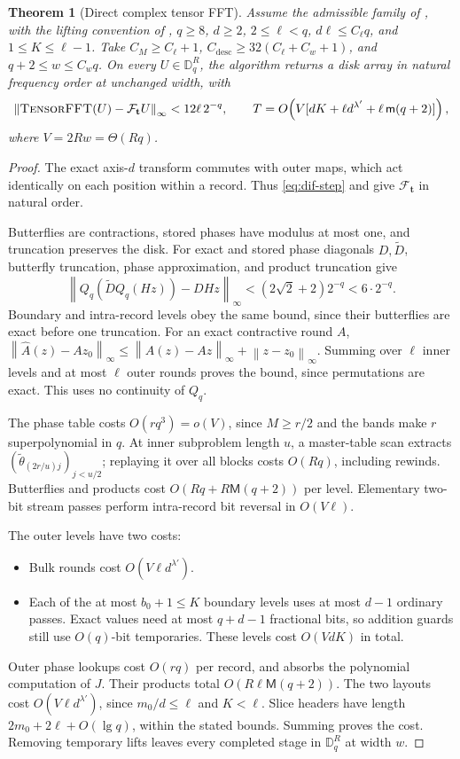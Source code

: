 \documentclass[11pt]{article}
\newtheorem{theorem}{Theorem}[section]
\theoremstyle{definition}
\renewcommand{\label}[1]{}%
\newcommand{\Disk}{\mathbb{D}}
\newcommand{\cF}{\mathcal{F}}
\newcommand{\norm}[1]{\left\lVert #1 \right\rVert}
\newcommand{\TensorFFT}{\textnormal{\textsc{TensorFFT}}}
\begin{document}
\begin{theorem}[Direct complex tensor FFT]\label{thm:direct-fft}
Assume the admissible family of , with the lifting
convention of , $q\ge8$, $d\ge2$, $2\le\ell<q$,
$d\ell\le C_\ell q$, and $1\le K\le\ell-1$.
Take $C_M\ge C_\ell+1$, $C_{\mathrm{desc}}\ge32(C_\ell+C_w+1)$,
and $q+2\le w\le C_wq$.
On every $U\in\Disk_q^R$, the algorithm returns a disk array in natural
frequency order at unchanged width, with
\[
 \norm{\TensorFFT(U)-\cF_{\mathbf t}U}_\infty<12\ell\,2^{-q},
 \qquad
 T=O\!\left(V[dK+\ell d^{\lambda'}+\ell\,\mathsf m(q+2)]\right),
\]
where $V=2Rw=\Theta(Rq)$.
\end{theorem}
\begin{proof}
The exact axis-$d$ transform commutes with outer maps, which act identically on each position within a record.
Thus \eqref{eq:dif-step} and  give $\cF_{\mathbf t}$ in natural order.

Butterflies are contractions, stored phases have modulus at most one,
and truncation preserves the disk.
For exact and stored phase diagonals $D,\widetilde D$, butterfly truncation,
phase approximation, and product truncation give
\[
 \norm{Q_q(\widetilde DQ_q(Hz))-DHz}_\infty
 <(2\sqrt2+2)2^{-q}<6\cdot2^{-q}.
\]
Boundary and intra-record levels obey the same bound, since their butterflies are exact before one truncation.
For an exact contractive round $A$,
$\norm{\widehat A(z)-Az_0}_\infty
 \le\norm{\widehat A(z)-Az}_\infty+\norm{z-z_0}_\infty$.
Summing over $\ell$ inner levels and at most $\ell$ outer rounds proves the bound, since permutations are exact.
This uses no continuity of $Q_q$.

The phase table costs $O(rq^3)=o(V)$, since $M\ge r/2$ and the bands make
$r$ superpolynomial in $q$.
At inner subproblem length $u$, a master-table scan extracts
$(\tilde\theta_{(2r/u)j})_{j<u/2}$; replaying it over all blocks costs
$O(Rq)$, including rewinds.
Butterflies and products cost $O(Rq+R\mathsf M(q+2))$ per level.
Elementary two-bit stream passes perform intra-record bit reversal in $O(V\ell)$.

The outer levels have two costs:
\begin{itemize}[leftmargin=*,nosep]
\item Bulk rounds cost $O(V\ell d^{\lambda'})$.
\item Each of the at most $b_0+1\le K$ boundary levels uses at most $d-1$ ordinary passes.
Exact values need at most $q+d-1$ fractional bits, so addition guards still use $O(q)$-bit temporaries.
These levels cost $O(VdK)$ in total.
\end{itemize}
Outer phase lookups cost $O(rq)$ per record, and  absorbs the polynomial computation of $J$.
Their products total $O(R\ell\mathsf M(q+2))$.
The two layouts cost $O(V\ell d^{\lambda'})$, since $m_0/d\le\ell$ and $K<\ell$.
Slice headers have length $2m_0+2\ell+O(\lg q)$, within the stated bounds.
Summing proves the cost.
Removing temporary lifts leaves every completed stage in $\Disk_q^R$ at width $w$.
\end{proof}
\end{document}
